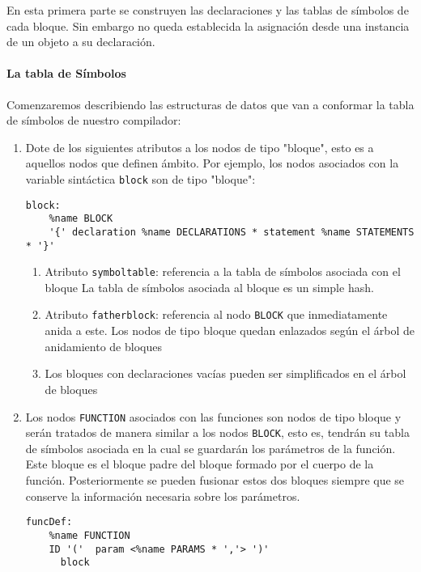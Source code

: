 En esta primera parte
se construyen las declaraciones y las tablas de símbolos de cada bloque. 
Sin embargo no queda establecida la asignación desde una instancia de un
objeto a su declaración.


\paragraph{La tabla de Símbolos}
Comenzaremos describiendo las estructuras de datos que van a conformar la tabla de símbolos
de nuestro compilador:

\begin{enumerate}
\item
Dote de los siguientes atributos a los nodos de tipo "bloque", 
esto es a aquellos nodos que definen ámbito. Por ejemplo, los nodos asociados
con la variable sintáctica \verb|block| son de tipo "bloque":
\begin{verbatim}
block:
    %name BLOCK
    '{' declaration %name DECLARATIONS * statement %name STATEMENTS * '}'
\end{verbatim}

  \begin{enumerate}
  \item
  Atributo \verb|symboltable|: referencia a la tabla de símbolos asociada con el bloque
  La tabla de símbolos asociada al bloque es un simple hash.
  \item
  Atributo \verb|fatherblock|: referencia al nodo \verb|BLOCK| que inmediatamente anida a este.
  Los nodos de tipo bloque quedan enlazados según el árbol de anidamiento de bloques
  \item
  Los bloques con declaraciones vacías pueden ser simplificados en el árbol de bloques
  \end{enumerate}

\item
Los nodos \verb|FUNCTION| asociados con las
funciones son nodos de tipo bloque y
serán tratados de manera similar a los nodos  \verb|BLOCK|, esto es, 
tendrán su tabla de símbolos asociada en la cual se guardarán los parámetros 
de la función. Este bloque es el bloque padre del bloque formado por
el cuerpo de la función. Posteriormente se pueden fusionar estos dos bloques
siempre que se conserve la información necesaria sobre los parámetros.

\begin{verbatim}
funcDef:
    %name FUNCTION
    ID '('  param <%name PARAMS * ','> ')' 
      block
\end{verbatim}


\end{enumerate}
